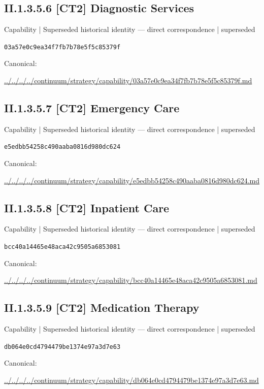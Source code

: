 \documentclass[10pt,a4paper]{article}
\begin{document}
\subsection*{II.1.3.5.6 [CT2] Diagnostic Services}
{\small Capability | Superseded historical identity — direct correspondence | superseded}\par
\texttt{03a57e0c9ea34f7fb7b78e5f5c85379f}\par
Canonical: \par
{\footnotesize\url{../../../../continuum/strategy/capability/03a57e0c9ea34f7fb7b78e5f5c85379f.md}}\par
\subsection*{II.1.3.5.7 [CT2] Emergency Care}
{\small Capability | Superseded historical identity — direct correspondence | superseded}\par
\texttt{e5edbb54258c490aaba0816d980dc624}\par
Canonical: \par
{\footnotesize\url{../../../../continuum/strategy/capability/e5edbb54258c490aaba0816d980dc624.md}}\par
\subsection*{II.1.3.5.8 [CT2] Inpatient Care}
{\small Capability | Superseded historical identity — direct correspondence | superseded}\par
\texttt{bcc40a14465e48aca42c9505a6853081}\par
Canonical: \par
{\footnotesize\url{../../../../continuum/strategy/capability/bcc40a14465e48aca42c9505a6853081.md}}\par
\subsection*{II.1.3.5.9 [CT2] Medication Therapy}
{\small Capability | Superseded historical identity — direct correspondence | superseded}\par
\texttt{db064e0cd4794479be1374e97a3d7e63}\par
Canonical: \par
{\footnotesize\url{../../../../continuum/strategy/capability/db064e0cd4794479be1374e97a3d7e63.md}}\par
\end{document}
